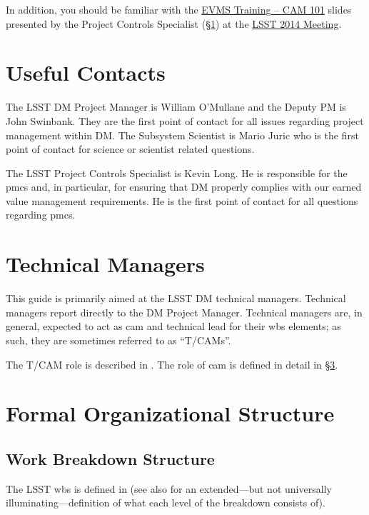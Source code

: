 In addition, you should be familiar with the \href{https://project.lsst.org/meetings/lsst2014/node/100}{EVMS Training -- CAM 101} slides presented by the Project Controls Specialist (\S\ref{sec:contacts}) at the \href{https://project.lsst.org/meetings/lsst2014/}{LSST 2014 Meeting}.

\section{Useful Contacts}
\label{sec:contacts}

The LSST DM Project Manager is William O'Mullane and the Deputy PM is John Swinbank.
They are the first point of contact for all issues regarding project management within DM.
The Subsystem Scientist is Mario Juric who is the first point of contact for science or scientist related questions.

The LSST Project Controls Specialist is Kevin Long.
He is responsible for the \gls{pmcs} and, in particular, for ensuring that DM properly complies with our earned value management requirements.
He is the first point of contact for all questions regarding \gls{pmcs}.

\section{Technical Managers}
\label{sec:tcam}

This guide is primarily aimed at the LSST DM technical managers.
Technical managers report directly to the DM Project Manager.
Technical managers are, in general, expected to act as \gls{cam} and technical lead for their \gls{wbs} \glspl{element}; as such, they are sometimes referred to as ``T/CAMs''.

The T/CAM role is described in .
The role of \gls{cam} is defined in detail in \S\ref{sec:structure}.

\section{Formal Organizational Structure}
\label{sec:structure}

\subsection{Work Breakdown Structure}
\label{sec:wbs}

The LSST \gls{wbs} is defined in  (see also  for an extended---but not universally illuminating---definition of what each level of the breakdown consists of).

